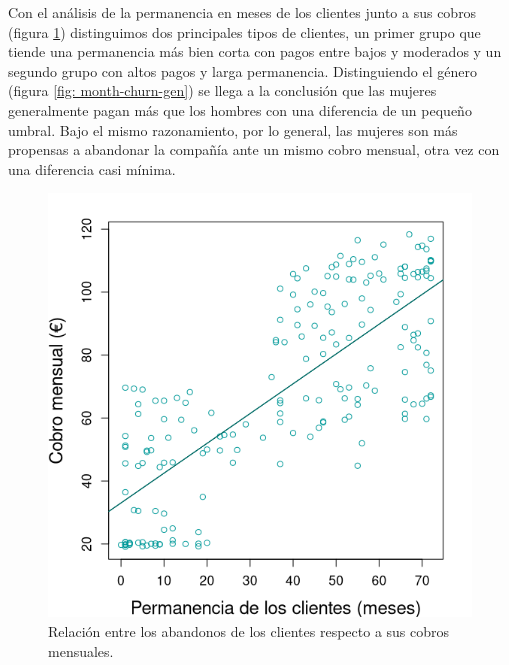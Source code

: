 \documentclass[10pt,a4paper, titlepage]{article}
\begin{document}
Con el análisis de la permanencia en meses de los clientes junto a sus cobros (figura \ref{fig: month-churn}) distinguimos dos principales tipos de clientes, un primer grupo que tiende una permanencia más bien corta con pagos entre bajos y moderados y un segundo grupo con altos pagos y larga permanencia. Distinguiendo el género (figura \ref{fig: month-churn-gen}) se llega a la conclusión que las mujeres generalmente pagan más que los hombres con una diferencia de un pequeño umbral. Bajo el mismo razonamiento, por lo general, las mujeres son más propensas a abandonar la compañía ante un mismo cobro mensual, otra vez con una diferencia casi mínima.
\begin{figure}[!htb]
   \begin{minipage}{0.48\textwidth}
     \centering
     \includegraphics[width=\linewidth]{month-churn}
	 \caption{Relación entre los abandonos de los clientes respecto a sus cobros mensuales.}\label{fig: month-churn}
   \end{minipage}\hfill
   \begin{minipage}{0.48\textwidth}
     \centering

\end{minipage}
\end{figure}
\end{document}
